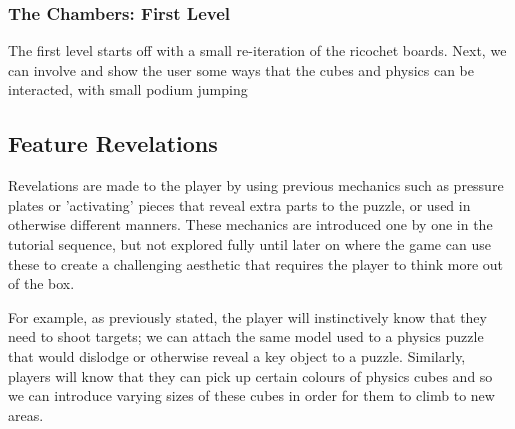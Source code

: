 \documentclass[11pt]{article}
\begin{document}
\subsubsection*{The Chambers: First Level}
The first level starts off with a small re-iteration of the ricochet boards. Next, we can involve and show the user some ways that the cubes and physics can be interacted, with small podium jumping 



\subsection{Feature Revelations}
Revelations are made to the player by using previous mechanics such as pressure plates or 'activating' pieces that reveal extra parts to the puzzle, or used in otherwise different manners. These mechanics are introduced one by one in the tutorial sequence, but not explored fully until later on where the game can use these to create a challenging aesthetic that requires the player to think more out of the box.

For example, as previously stated, the player will instinctively know that they need to shoot targets; we can attach the same model used to a physics puzzle that would dislodge or otherwise reveal a key object to a puzzle. Similarly, players will know that they can pick up certain colours of physics cubes and so we can introduce varying sizes of these cubes in order for them to climb to new areas.
\end{document}
